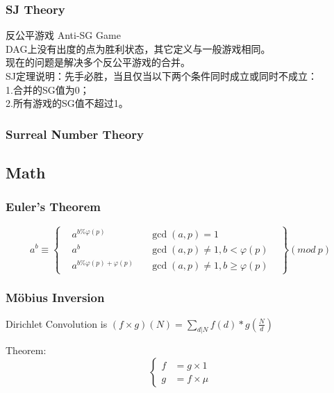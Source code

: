 \documentclass[10pt]{ctexart}
\begin{document}
{{\subsubsection{SJ Theory}
反公平游戏 Anti-SG Game\\
DAG上没有出度的点为胜利状态，其它定义与一般游戏相同。\\
现在的问题是解决多个反公平游戏的合并。\\
SJ定理说明：先手必胜，当且仅当以下两个条件同时成立或同时不成立：\\
1.合并的SG值为0；\\
2.所有游戏的SG值不超过1。\\
\subsubsection{Surreal Number Theory}

\subsection{Math}
\subsubsection{Euler's Theorem}
\begin{equation*}
    a^b\equiv\left\{
    \begin{aligned}
    &a^{b\%\varphi(p)} & & \gcd(a,p)=1&\\
    &a^b & &\gcd(a,p)\not=1,b<\varphi(p) \\
    &a^{b\%\varphi(p) + \varphi(p)} & & \gcd(a,p)\not=1,b\geq \varphi(p) &
    \end{aligned}
    \right\}
    (mod\ p)
\end{equation*}
\subsubsection{Möbius Inversion}
{
Dirichlet Convolution is $(f\times g)(N)=\sum_{d|N} f(d) * g(\frac{N}{d})$
\par
Theorem:
\begin{equation*}
    \left\{
        \begin{aligned} 
            f &= g \times 1 \\
            g &= f \times \mu
        \end{aligned} 
    \right. 
\end{equation*}
}

}}
\end{document}
